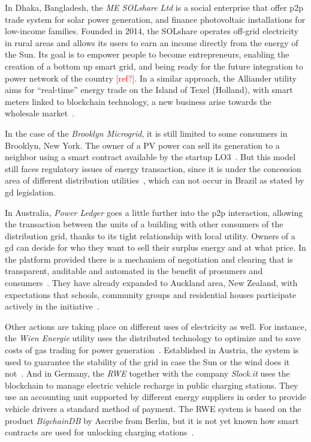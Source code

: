 In Dhaka, Bangladesh, the \emph{ME SOLshare Ltd} is a social enterprise that offer \acrshort{p2p} trade system for solar power generation, and finance photovoltaic installations for low-income families.
Founded in 2014, the SOLshare operates off-grid electricity in rural areas and allows its users to earn an income directly from the energy of the Sun.
Its goal is to empower people to become entrepreneurs, enabling the creation of a bottom up smart grid, and being ready for the future integration to power network of the country \textcolor{red}{[ref?]}.
In a similar approach, the Alliander utility aims for ``real-time'' energy trade on the Island of Texel (Holland),
with smart meters linked to blockchain technology, a new business arise towards the wholesale market~\cite{groarke2016}.

In the case of the \emph{Brooklyn Microgrid}, it is still limited to some consumers in Brooklyn, New York.
The owner of a PV power can sell its generation to a neighbor using a smart contract available by the startup LO3~\cite{blocktrading}. %
But this model still faces regulatory issues of energy transaction, since it is under the concession area of different distribution utilities~\cite{mengelkamp2018}, which can not occur in Brazil as stated by \acrshort{gd} legislation.

In Australia, \emph{Power Ledger} goes a little further into the \acrshort{p2p} interaction, allowing the transaction between the units of a building with other consumers of the distribution grid, thanks to its tight relationship with local utility.
Owners of a \acrshort{gd} can decide for who they want to sell their surplus energy and at what price.
In the platform provided there is a mechanism of negotiation and clearing that is transparent, auditable and automated in the benefit of prosumers and consumers~\cite{pwrledger}.
They have already expanded to Auckland area, New Zealand, with expectations that schools, community groups and residential houses participate actively in the initiative~\cite{groarke2016}.

Other actions are taking place on different uses of electricity as well.
For instance, the \emph{Wien Energie} utility uses the distributed technology to optimize and to save costs of gas trading for power generation~\cite{groarke2016}.
Established in Austria, the system is used to guarantee the stability of the grid in case the Sun or the wind does it not~\cite{wien-energie2016}.
And in Germany, the \emph{RWE} together with the company \emph{Slock.it} uses the blockchain to manage electric vehicle recharge in public charging stations.
They use an accounting unit supported by different energy suppliers in order to provide vehicle drivers a standard method of payment.
The RWE system is based on the product \emph{BigchainDB} by Ascribe from Berlin, but it is not yet known how smart contracts are used for unlocking charging stations~\cite{blocktrading}.

